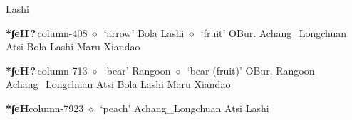          Lashi 
  \item {\footnotesize \textbf{*ʃeH\,?\,}}{\tiny column-408}
         $\diamond$~`arrow'
         Bola 
\hspace{1ex}
         Lashi 
\hspace{1ex}
         $\diamond$~`fruit'
         OBur. 
\hspace{1ex}
         Achang\_Longchuan 
\hspace{1ex}
         Atsi 
\hspace{1ex}
         Bola 
\hspace{1ex}
         Lashi 
\hspace{1ex}
         Maru 
\hspace{1ex}
         Xiandao 
  \item {\footnotesize \textbf{*ʃeH\,?\,}}{\tiny column-713}
         $\diamond$~`bear'
         Rangoon 
\hspace{1ex}
         $\diamond$~`bear (fruit)'
         OBur. 
\hspace{1ex}
         Rangoon 
\hspace{1ex}
         Achang\_Longchuan 
\hspace{1ex}
         Atsi 
\hspace{1ex}
         Bola 
\hspace{1ex}
         Lashi 
\hspace{1ex}
         Maru 
\hspace{1ex}
         Xiandao 
  \item {\footnotesize \textbf{*ʃeH}}{\tiny column-7923}
         $\diamond$~`peach'
         Achang\_Longchuan 
\hspace{1ex}
         Atsi 
\hspace{1ex}
         Lashi 
\hspace{1ex}
